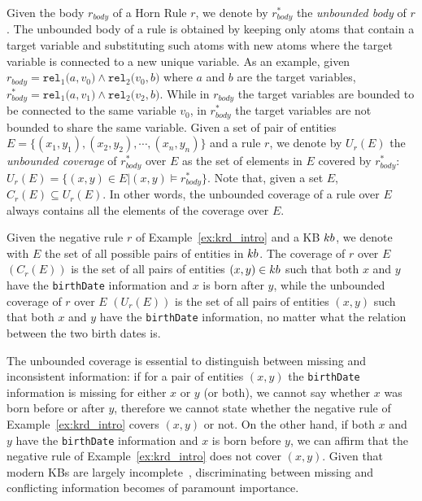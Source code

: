 Given the body $r_{body}$ of a Horn Rule $r$, we denote by $r^{*}_{body}$ the \emph{unbounded body} of $r$. The unbounded body of a rule is obtained by keeping only atoms that contain a target variable and substituting such atoms with new atoms where the target variable is connected to a new unique variable. As an example, given $r_{body} = \texttt{rel}_1\texttt{(}a,v_0\texttt{)} \wedge \texttt{rel}_2\texttt{(}v_0,b\texttt{)}$ where $a$ and $b$ are the target variables, $r^{*}_{body} = \texttt{rel}_1\texttt{(}a,v_1\texttt{)} \wedge \texttt{rel}_2\texttt{(}v_2,b\texttt{)}$.
While in $r_{body}$ the target variables are bounded to be connected to the same variable $v_0$, in $r^{*}_{body}$ the target variables are not bounded to share the same variable.
Given a set of pair of entities $E = \{(x_1,y_1),(x_2,y_2),\cdots,(x_n,y_n)\}$ and a rule $r$, we denote by $U_r(E)$ the \emph{unbounded coverage} of $r^{*}_{body}$ over $E$ as the set of elements in $E$ covered by $r^{*}_{body}$: $U_r(E)=\{(x,y) \in E | (x,y) \models r^{*}_{body}\}$. Note that, given a set $E$, $C_r(E) \subseteq U_r(E)$. In other words, the unbounded coverage of a rule over $E$ always contains all the elements of the coverage over $E$.

\begin{example}
	Given the negative rule $r$ of Example~\ref{ex:krd_intro} and a KB ${\sc kb}$, we denote with $E$ the set of all possible pairs of entities in ${\sc kb}$. The coverage of $r$ over $E$ $(C_r(E))$ is the set of all pairs of entities $(x,y) \in {\sc kb}$ such that both $x$ and $y$ have the \texttt{birthDate} information and $x$ is born after $y$, while the unbounded coverage of $r$ over $E$ $(U_r(E))$ is the set of all pairs of entities $(x,y)$ such that both $x$ and $y$ have the \texttt{birthDate} information, no matter what the relation between the two birth dates is. 
\end{example}

The unbounded coverage is essential to distinguish between missing and inconsistent information: if for a pair of entities $(x,y)$ the \texttt{birthDate} information is missing for either $x$ or $y$ (or both), we cannot say whether $x$ was born before or after $y$, therefore we cannot state whether
the negative rule of Example~\ref{ex:krd_intro} covers $(x,y)$ or not. On the other hand, if both $x$ and $y$ have the \texttt{birthDate} information and $x$ is born before $y$, we can affirm that the negative rule of Example~\ref{ex:krd_intro} does not cover $(x,y)$. Given that modern KBs are largely incomplete~\cite{dong2014knowledge,min2013distant}, discriminating between missing and conflicting information becomes of paramount importance.

